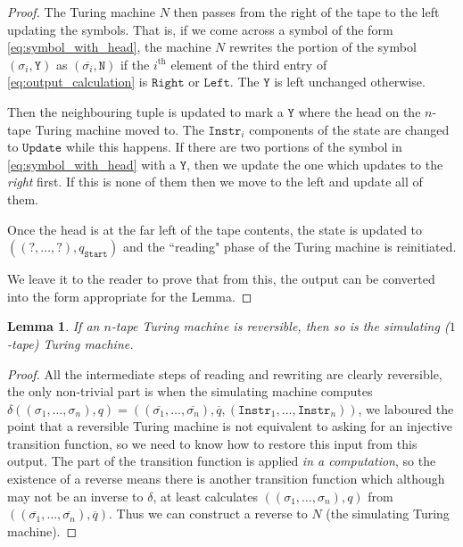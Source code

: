 \documentclass[12pt]{article}
\theoremstyle{plain}
\newtheorem{lemma}[thm]{Lemma}
\theoremstyle{definition}
\begin{document}
\begin{proof}
	The Turing machine $N$ then passes from the right of the tape to the left updating the symbols. That is, if we come across a symbol of the form \eqref{eq:symbol_with_head}, the machine $N$ rewrites the portion of the symbol $(\sigma_i, \texttt{Y})$ as $(\overline{\sigma_i}, \texttt{N})$ if the $i^{\text{th}}$ element of the third entry of \eqref{eq:output_calculation} is $\texttt{Right}$ or $\texttt{Left}$. The $\texttt{Y}$ is left unchanged otherwise.
	
	Then the neighbouring tuple is updated to mark a $\texttt{Y}$ where the head on the $n$-tape Turing machine moved to. The $\texttt{Instr}_i$ components of the state are changed to $\texttt{Update}$ while this happens. If there are two portions of the symbol in \eqref{eq:symbol_with_head} with a $\texttt{Y}$, then we update the one which updates to the \emph{right} first. If this is none of them then we move to the left and update all of them.
	
	Once the head is at the far left of the tape contents, the state is updated to $((?,\ldots, ?), q_{\texttt{Start}})$ and the ``reading" phase of the Turing machine is reinitiated.
	
	We leave it to the reader to prove that from this, the output can be converted into the form appropriate for the Lemma.
\end{proof}

\begin{lemma}
	If an $n$-tape Turing machine is reversible, then so is the simulating ($1$-tape) Turing machine.
\end{lemma}
\begin{proof}
	All the intermediate steps of reading and rewriting are clearly reversible, the only non-trivial part is when the simulating machine computes $\delta((\sigma_1, \ldots, \sigma_n), q) = ((\overline{\sigma_1},\ldots, \overline{\sigma_n}), \overline{q}, (\texttt{Instr}_1, \ldots, \texttt{Instr}_n))$, we laboured the point that a reversible Turing machine is not equivalent to asking for an injective transition function, so we need to know how to restore this input from this output. The part of the transition function is applied \emph{in a computation}, so the existence of a reverse means there is another transition function which although may not be an inverse to $\delta$, at least calculates $((\sigma_1, \ldots, \sigma_n), q)$ from $((\overline{\sigma_1},\ldots, \overline{\sigma_n}), \overline{q})$. Thus we can construct a reverse to $N$ (the simulating Turing machine).
\end{proof}
	
\end{document}
